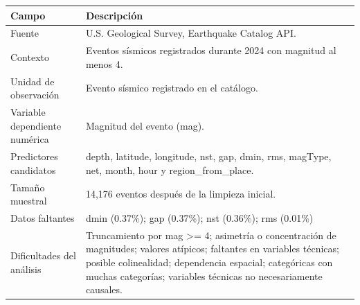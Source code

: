 \begin{tabularx}{\textwidth}{@{}p{}X@{}}
\toprule
Campo & Descripción \\
\midrule
Fuente & U.S. Geological Survey, Earthquake Catalog API. \\
Contexto & Eventos sísmicos registrados durante 2024 con magnitud al menos 4. \\
Unidad de observación & Evento sísmico registrado en el catálogo. \\
Variable dependiente numérica & Magnitud del evento (mag). \\
Predictores candidatos & depth, latitude, longitude, nst, gap, dmin, rms, magType, net, month, hour y region\_from\_place. \\
Tamaño muestral & 14,176 eventos después de la limpieza inicial. \\
Datos faltantes & dmin (0.37\%); gap (0.37\%); nst (0.36\%); rms (0.01\%) \\
Dificultades del análisis & Truncamiento por mag >= 4; asimetría o concentración de magnitudes; valores atípicos; faltantes en variables técnicas; posible colinealidad; dependencia espacial; categóricas con muchas categorías; variables técnicas no necesariamente causales. \\
\bottomrule
\end{tabularx}
